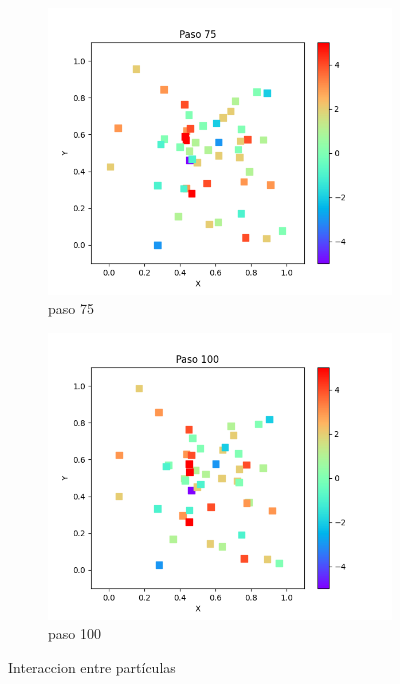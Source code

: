 \documentclass{article}
\begin{document}
\begin{figure}
\begin{subfigure}[b]{0.45\linewidth}
            \includegraphics[width=\linewidth]{p9p_t075.png}
            \caption{paso 75}
            \label{f2.b}
        \end{subfigure}
\begin{subfigure}[b]{0.45\linewidth}
            \includegraphics[width=\linewidth]{p9p_t100.png}
            \caption{paso 100}
            \label{f2.b}
        \end{subfigure}
\caption{Interaccion entre part\'iculas}
        \label{f6}
\end{figure}
\end{document}
